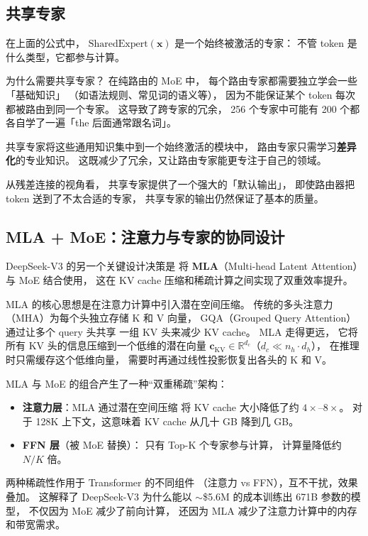 \subsection{共享专家}

在上面的公式中，
$\mathrm{SharedExpert}(\mathbf{x})$ 是一个始终被激活的专家：
不管 token 是什么类型，它都参与计算。

为什么需要共享专家？
在纯路由的 MoE 中，
每个路由专家都需要独立学会一些「基础知识」
（如语法规则、常见词的语义等），
因为不能保证某个 token 每次都被路由到同一个专家。
这导致了跨专家的冗余，
256 个专家中可能有 200 个都各自学了一遍「the 后面通常跟名词」。

共享专家将这些通用知识集中到一个始终激活的模块中，
路由专家只需学习\textbf{差异化}的专业知识。
这既减少了冗余，又让路由专家能更专注于自己的领域。

从残差连接的视角看，
共享专家提供了一个强大的「默认输出」，
即使路由器把 token 送到了不太合适的专家，
共享专家的输出仍然保证了基本的质量。

\subsection{MLA + MoE：注意力与专家的协同设计}

DeepSeek-V3 的另一个关键设计决策是
将 \textbf{MLA}（Multi-head Latent Attention）
与 MoE 结合使用，
这在 KV cache 压缩和稀疏计算之间实现了双重效率提升。

MLA 的核心思想是在注意力计算中引入潜在空间压缩。
传统的多头注意力（MHA）为每个头独立存储 K 和 V 向量，
GQA（Grouped Query Attention）通过让多个 query 头共享
一组 KV 头来减少 KV cache。
MLA 走得更远，
它将所有 KV 头的信息压缩到一个低维的潜在向量
$\mathbf{c}_{\mathrm{KV}} \in \mathbb{R}^{d_c}$（$d_c \ll n_h \cdot d_h$），
在推理时只需缓存这个低维向量，
需要时再通过线性投影恢复出各头的 K 和 V。

MLA 与 MoE 的组合产生了一种“双重稀疏”架构：
\begin{itemize}[noitemsep]
  \item \textbf{注意力层}：MLA 通过潜在空间压缩
        将 KV cache 大小降低了约 $4\times$--$8\times$。
        对于 128K 上下文，这意味着
        KV cache 从几十 GB 降到几 GB。
  \item \textbf{FFN 层}（被 MoE 替换）：
        只有 Top-K 个专家参与计算，
        计算量降低约 $N/K$ 倍。
\end{itemize}

两种稀疏性作用于 Transformer 的不同组件
（注意力 vs FFN），互不干扰，效果叠加。
这解释了 DeepSeek-V3 为什么能以
$\sim$\$5.6M 的成本训练出 671B 参数的模型，
不仅因为 MoE 减少了前向计算，
还因为 MLA 减少了注意力计算中的内存和带宽需求。

